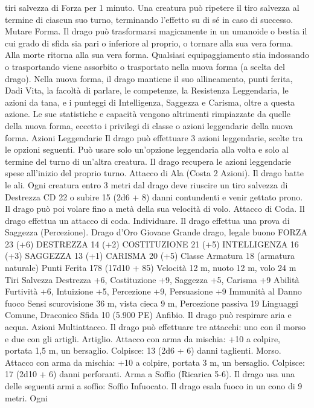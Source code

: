 \begin{multicols}{2}
tiri salvezza di Forza per 1 minuto. Una creatura può ripetere il tiro
salvezza al termine di ciascun suo turno, terminando l’effetto su di sé
in caso di successo.
Mutare Forma. Il drago può trasformarsi magicamente in un
umanoide o bestia il cui grado di sfida sia pari o inferiore al proprio,
o tornare alla sua vera forma. Alla morte ritorna alla sua vera forma.
Qualsiasi equipaggiamento stia indossando o trasportando viene
assorbito o trasportato nella nuova forma (a scelta del drago).
Nella nuova forma, il drago mantiene il suo allineamento, punti
ferita, Dadi Vita, la facoltà di parlare, le competenze, la Resistenza
Leggendaria, le azioni da tana, e i punteggi di Intelligenza, Saggezza
e Carisma, oltre a questa azione. Le sue statistiche e capacità
vengono altrimenti rimpiazzate da quelle della nuova forma, eccetto i
privilegi di classe o azioni leggendarie della nuova forma.
Azioni Leggendarie
Il drago può effettuare 3 azioni leggendarie, scelte tra le opzioni
seguenti. Può usare solo un’opzione leggendaria alla volta e solo
al termine del turno di un’altra creatura. Il drago recupera le
azioni leggendarie spese all’inizio del proprio turno.
Attacco di Ala (Costa 2 Azioni). Il drago batte le ali. Ogni
creatura entro 3 metri dal drago deve riuscire un tiro salvezza di
Destrezza CD 22 o subire 15 (2d6 + 8) danni contundenti e venir
gettato prono. Il drago può poi volare fino a metà della sua
velocità di volo.
Attacco di Coda. Il drago effettua un attacco di coda.
Individuare. Il drago effettua una prova di Saggezza
(Percezione).
Drago d’Oro Giovane
Grande drago, legale buono
FORZA 23 (+6)
DESTREZZA 14 (+2)
COSTITUZIONE 21 (+5)
INTELLIGENZA 16 (+3)
SAGGEZZA 13 (+1)
CARISMA 20 (+5)
Classe Armatura 18 (armatura naturale)
Punti Ferita 178 (17d10 + 85)
Velocità 12 m, nuoto 12 m, volo 24 m
Tiri Salvezza Destrezza +6, Costituzione +9, Saggezza +5,
Carisma +9
Abilità Furtività +6, Intuizione +5, Percezione +9, Persuasione +9
Immunità al Danno fuoco
Sensi scurovisione 36 m, vista cieca 9 m, Percezione passiva 19
Linguaggi Comune, Draconico
Sfida 10 (5.900 PE)
Anfibio. Il drago può respirare aria e acqua.
Azioni
Multiattacco. Il drago può effettuare tre attacchi: uno con il
morso e due con gli artigli.
Artiglio. Attacco con arma da mischia: +10 a colpire, portata 1,5
m, un bersaglio.
Colpisce: 13 (2d6 + 6) danni taglienti.
Morso. Attacco con arma da mischia: +10 a colpire, portata 3 m,
un bersaglio.
Colpisce: 17 (2d10 + 6) danni perforanti.
Arma a Soffio (Ricarica 5-6). Il drago usa una delle seguenti armi
a soffio:
Soffio Infuocato. Il drago esala fuoco in un cono di 9 metri. Ogni

\end{multicols}
